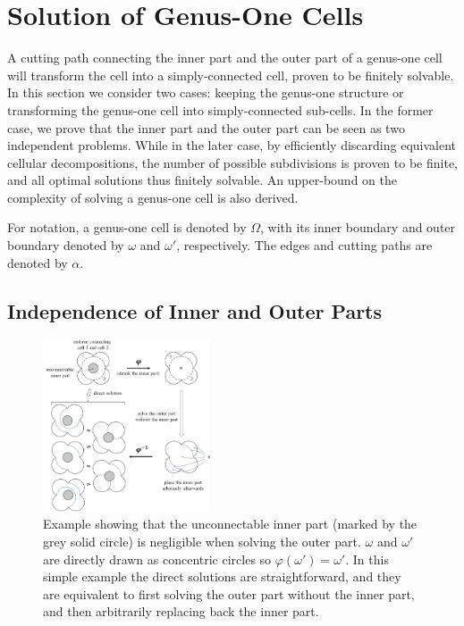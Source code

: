 \documentclass[conference]{IEEEtran}
\begin{document}
\section{Solution of Genus-One Cells}
\label{section_genus_one}
A cutting path connecting the inner part and the outer part of a genus-one cell will transform the cell into a 
simply-connected cell, %
proven to be finitely solvable. 
In this section we consider two cases: keeping the genus-one structure or transforming the genus-one cell into 
simply-connected sub-cells. In the former case, we prove that the inner part and the outer part can be seen as two independent problems. 
While in the later case, by efficiently discarding equivalent cellular decompositions, the number of possible subdivisions is proven to be finite, 
and all optimal solutions thus finitely solvable. An upper-bound on the complexity of solving a genus-one cell is also derived.  

For notation, a genus-one cell is denoted by $\Omega$, with its inner boundary and outer boundary denoted by $\omega$ and $\omega'$, 
respectively. The edges and cutting paths are denoted by $\alpha$. 

\subsection{Independence of Inner and Outer Parts}
\label{subsection_un_inner_cell}
\begin{figure}[t]
\centering
\includegraphics[width = 0.44\textwidth]{figures/proof/fig_physical_hole_4}
\caption{Example showing that the unconnectable inner part (marked by the grey solid circle) is negligible when solving the outer part. 
$\omega$ and $\omega'$ are directly drawn as concentric circles so $\varphi(\omega') = \omega'$. 
In this simple example the direct solutions are straightforward, and they are equivalent to first solving the outer part without
 the inner part, and then arbitrarily replacing back the inner part.}
 \label{fig_physical_hole}
\end{figure}
\end{document}
